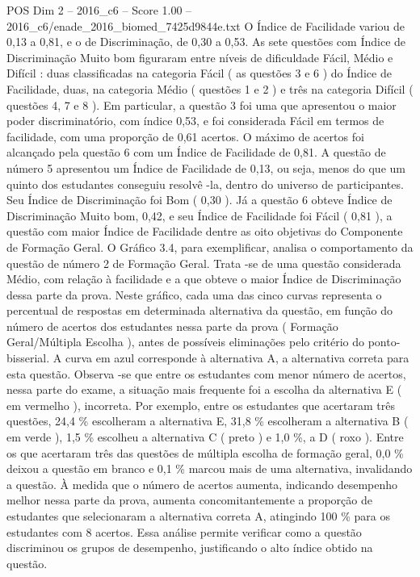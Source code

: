 \begin{textsample}{POS Dim 2 – 2016\_c6 – Score 1.00 – 2016\_c6/enade\_2016\_biomed\_7425d9844e.txt}
O Índice de Facilidade variou de 0,13 a 0,81, e o de Discriminação, de 0,30 a 0,53.
As sete questões com Índice de Discriminação Muito bom figuraram entre níveis de dificuldade Fácil, Médio e Difícil : duas classificadas na categoria Fácil ( as questões 3 e 6 ) do Índice de Facilidade, duas, na categoria Médio ( questões 1 e 2 ) e três na categoria Difícil ( questões 4, 7 e 8 ).
Em particular, a questão 3 foi uma que apresentou o maior poder discriminatório, com índice 0,53, e foi considerada Fácil em termos de facilidade, com uma proporção de 0,61 acertos.
O máximo de acertos foi alcançado pela questão 6 com um Índice de Facilidade de 0,81.
A questão de número 5 apresentou um Índice de Facilidade de 0,13, ou seja, menos do que um quinto dos estudantes conseguiu resolvê -la, dentro do universo de participantes.
Seu Índice de Discriminação foi Bom ( 0,30 ).
Já a questão 6 obteve Índice de Discriminação Muito bom, 0,42, e seu Índice de Facilidade foi Fácil ( 0,81 ), a questão com maior Índice de Facilidade dentre as oito objetivas do Componente de Formação Geral.
O Gráfico 3.4, para exemplificar, analisa o comportamento da questão de número 2 de Formação Geral.
Trata -se de uma questão considerada Médio, com relação à facilidade e a que obteve o maior Índice de Discriminação dessa parte da prova.
Neste gráfico, cada uma das cinco curvas representa o percentual de respostas em determinada alternativa da questão, em função do número de acertos dos estudantes nessa parte da prova ( Formação Geral/Múltipla Escolha ), antes de possíveis eliminações pelo critério do ponto-bisserial.
A curva em azul corresponde à alternativa A, a alternativa correta para esta questão.
Observa -se que entre os estudantes com menor número de acertos, nessa parte do exame, a situação mais frequente foi a escolha da alternativa E ( em vermelho ), incorreta.
Por exemplo, entre os estudantes que acertaram três questões, 24,4 \% escolheram a alternativa E, 31,8 \% escolheram a alternativa B ( em verde ), 1,5 \% escolheu a alternativa C ( preto ) e 1,0 \%, a D ( roxo ).
Entre os que acertaram três das questões de múltipla escolha de formação geral, 0,0 \% deixou a questão em branco e 0,1 \% marcou mais de uma alternativa, invalidando a questão.
À medida que o número de acertos aumenta, indicando desempenho melhor nessa parte da prova, aumenta concomitantemente a proporção de estudantes que selecionaram a alternativa correta A, atingindo 100 \% para os estudantes com 8 acertos.
Essa análise permite verificar como a questão discriminou os grupos de desempenho, justificando o alto índice obtido na questão.

\end{textsample}
